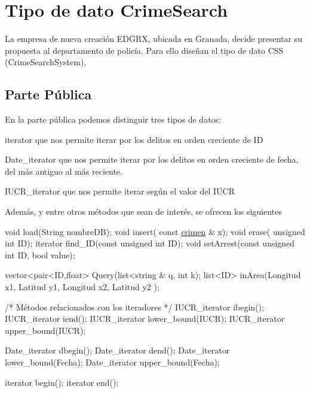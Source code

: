 \hypertarget{index_TDA}{}\section{Tipo de dato Crime\+Search}\label{index_TDA}
La empresa de nueva creación E\+D\+G\+R\+X, ubicada en Granada, decide presentar su propuesta al departamento de policía. Para ello diseñan el tipo de dato C\+S\+S (Crime\+Search\+System),\hypertarget{index_publico}{}\subsection{Parte Pública}\label{index_publico}
En la parte pública podemos distinguir tres tipos de datos\+:

\begin{DoxyItemize}
\item iterator que nos permite iterar por los delitos en orden creciente de I\+D \item Date\+\_\+iterator que nos permite iterar por los delitos en orden creciente de fecha, del más antiguo al más reciente. \item I\+U\+C\+R\+\_\+iterator que nos permite iterar según el valor del I\+U\+C\+R\end{DoxyItemize}
Además, y entre otros métodos que sean de interés, se ofrecen los siguientes


\begin{DoxyCode}
\textcolor{keywordtype}{void} load(String nombreDB);
\textcolor{keywordtype}{void} insert( \textcolor{keyword}{const} \hyperlink{classcrimen}{crimen} & x);
\textcolor{keywordtype}{void} erase( \textcolor{keywordtype}{unsigned} \textcolor{keywordtype}{int} ID);
iterator find\_ID(\textcolor{keyword}{const} \textcolor{keywordtype}{unsigned} \textcolor{keywordtype}{int} ID);
\textcolor{keywordtype}{void} setArrest(\textcolor{keyword}{const} \textcolor{keywordtype}{unsigned} \textcolor{keywordtype}{int} ID, \textcolor{keywordtype}{bool} value);

vector<pair<ID,float> Query(list<\textcolor{keywordtype}{string} & q, \textcolor{keywordtype}{int} k);    
list<ID> inArea(Longitud x1, Latitud y1, Longitud x2, Latitud y2 );

\textcolor{comment}{/* Métodos relacionados con los iteradores */}
IUCR\_iterator ibegin();
IUCR\_iterator iend();
IUCR\_iterator lower\_bound(IUCR);
IUCR\_iterator upper\_bound(IUCR);

Date\_iterator dbegin();
Date\_iterator dend();
Date\_iterator lower\_bound(Fecha);
Date\_iterator upper\_bound(Fecha);

iterator begin();
iterator end();
\end{DoxyCode}


